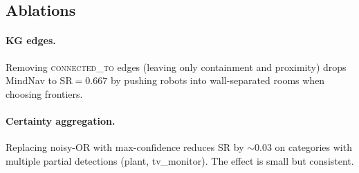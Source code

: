 \subsection{Ablations}
\paragraph{KG edges.} Removing \textsc{connected\_to} edges (leaving only
containment and proximity) drops MindNav to $\mathrm{SR}{=}0.667$ by pushing
robots into wall-separated rooms when choosing frontiers.
\paragraph{Certainty aggregation.} Replacing noisy-OR with max-confidence
reduces SR by $\sim 0.03$ on categories with multiple partial detections
(plant, tv\_monitor). The effect is small but consistent.

